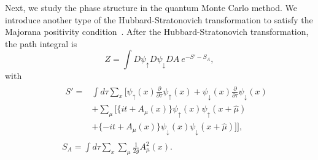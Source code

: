 \documentclass[aps,prb,superscriptaddress,twocolumn]{revtex4-1}
\begin{document}
Next, we study the phase structure in the quantum Monte Carlo method.
We introduce another type of the Hubbard-Stratonovich transformation to satisfy the Majorana positivity condition~\cite{2016CMaPh.346.1021J,2016PhRvL.116y0601W,Li:2016gte,Hayata:2017jdh}.
After the Hubbard-Stratonovich transformation, the path integral is
\begin{equation}
 Z = \int D\psi_\uparrow D\psi_\downarrow DA \ e^{ - S' - S_A } ,
\label{eqZ2}
\end{equation}
with
\begin{eqnarray}
&&
\begin{split}
S'
=& \int d\tau \sum_x \bigg[
\psi_\uparrow(x) \frac{\partial}{\partial\tau} \psi_\uparrow(x) + \psi_\downarrow(x)  \frac{\partial}{\partial\tau} \psi_\downarrow(x)
\\
&+ \sum_\mu [ \{ it + A_\mu(x) \} \psi_\uparrow(x) \psi_\uparrow(x+\hat{\mu})
\\
&+ \{ -it + A_\mu(x) \} \psi_\downarrow(x) \psi_\downarrow(x+\hat{\mu}) ] \bigg] ,
\end{split}
\\
&&
S_A = \int d\tau \sum_x \sum_\mu \frac{1}{2g} A_\mu^2 (x)
.
\end{eqnarray}
\end{document}
